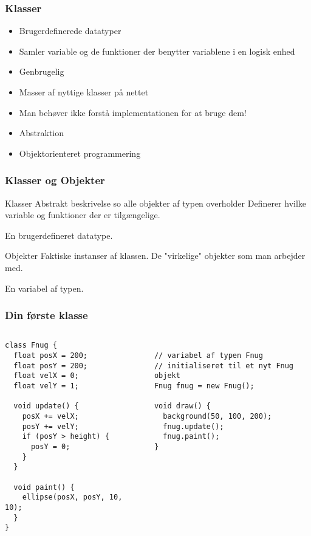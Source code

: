 \documentclass{beamer}
\begin{document}
\begin{frame}
  \frametitle{Klasser}

  \begin{itemize}
  \item Brugerdefinerede datatyper
  \item Samler variable og de funktioner der benytter variablene i en logisk enhed
  \item Genbrugelig
  \item Masser af nyttige klasser på nettet
  \item Man behøver ikke forstå implementationen for at bruge dem! 
  \item Abstraktion
  \item Objektorienteret programmering
  \end{itemize}

\end{frame}

\begin{frame}
  \frametitle{Klasser og Objekter}

  \begin{block}{Klasser}
  Abstrakt beskrivelse so alle objekter af typen overholder 
  Definerer hvilke variable og funktioner der er tilgængelige.
  
  En brugerdefineret datatype.
  \end{block}
  
  \begin{block}{Objekter}
  Faktiske instanser af klassen. De "virkelige" objekter som
  man arbejder med.
  
  En variabel af typen.
  \end{block}
  
\end{frame}


\begin{frame}[fragile]
  \frametitle{Din første klasse}

  \begin{columns}
  \begin{column}{0.5\textwidth}
{\small
\begin{verbatim}
class Fnug {
  float posX = 200;
  float posY = 200;
  float velX = 0;
  float velY = 1;

  void update() {
    posX += velX;
    posY += velY;
    if (posY > height) {
      posY = 0;
    }
  }
  
  void paint() {
    ellipse(posX, posY, 10, 10);  
  }
}
\end{verbatim}
}
  \end{column}
  
  \begin{column}{0.5\textwidth}
{\small
\begin{verbatim}

// variabel af typen Fnug
// initialiseret til et nyt Fnug objekt
Fnug fnug = new Fnug();

void draw() {
  background(50, 100, 200);
  fnug.update();
  fnug.paint();
}
\end{verbatim}  
}
  \end{column}
  \end{columns}

\end{frame}
\end{document}
